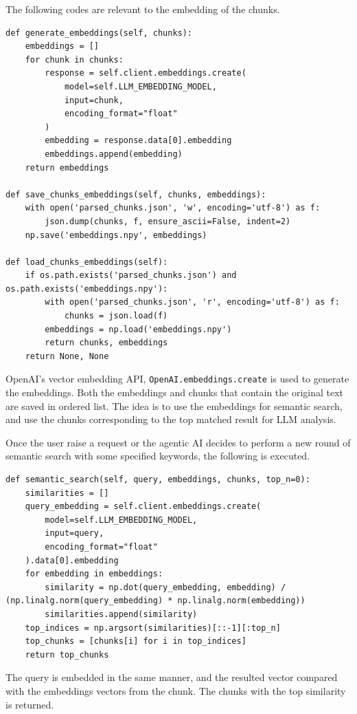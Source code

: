 The following codes are relevant to the embedding of the chunks.

\begin{lstlisting}
def generate_embeddings(self, chunks):
    embeddings = []
    for chunk in chunks:
        response = self.client.embeddings.create(
            model=self.LLM_EMBEDDING_MODEL,
            input=chunk,
            encoding_format="float"
        )
        embedding = response.data[0].embedding
        embeddings.append(embedding)
    return embeddings

def save_chunks_embeddings(self, chunks, embeddings):
    with open('parsed_chunks.json', 'w', encoding='utf-8') as f:
        json.dump(chunks, f, ensure_ascii=False, indent=2)
    np.save('embeddings.npy', embeddings)

def load_chunks_embeddings(self):
    if os.path.exists('parsed_chunks.json') and os.path.exists('embeddings.npy'):
        with open('parsed_chunks.json', 'r', encoding='utf-8') as f:
            chunks = json.load(f)
        embeddings = np.load('embeddings.npy')
        return chunks, embeddings
    return None, None
\end{lstlisting}

OpenAI's vector embedding API, \verb|OpenAI.embeddings.create| is used to generate the embeddings. Both the embeddings and chunks that contain the original text are saved in ordered list. The idea is to use the embeddings for semantic search, and use the chunks corresponding to the top matched result for LLM analysis. 

Once the user raise a request or the agentic AI decides to perform a new round of semantic search with some specified keywords, the following is executed.

\begin{lstlisting}
def semantic_search(self, query, embeddings, chunks, top_n=0):
    similarities = []
    query_embedding = self.client.embeddings.create(
        model=self.LLM_EMBEDDING_MODEL,
        input=query,
        encoding_format="float"
    ).data[0].embedding
    for embedding in embeddings:
        similarity = np.dot(query_embedding, embedding) / (np.linalg.norm(query_embedding) * np.linalg.norm(embedding))
        similarities.append(similarity)
    top_indices = np.argsort(similarities)[::-1][:top_n]
    top_chunks = [chunks[i] for i in top_indices]
    return top_chunks
\end{lstlisting}

The query is embedded in the same manner, and the resulted vector compared with the embeddings vectors from the chunk. The chunks with the top similarity is returned.

